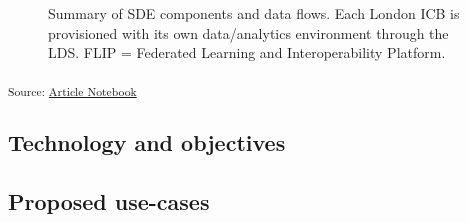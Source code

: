 \documentclass[
  letterpaper,
  DIV=11,
  numbers=noendperiod]{scrartcl}
\begin{document}
\begin{figure}


\caption{\label{fig-sde-summary}Summary of SDE components and data
flows. Each London ICB is provisioned with its own data/analytics
environment through the LDS. FLIP = Federated Learning and
Interoperability Platform.}

\end{figure}%

\textsubscript{Source:
\href{https://d3london.github.io/sde_aic_docs/index.qmd.html}{Article
Notebook}}

\subsection{Technology and objectives}\label{technology-and-objectives}

\subsection{Proposed use-cases}\label{proposed-use-cases}
\end{document}

